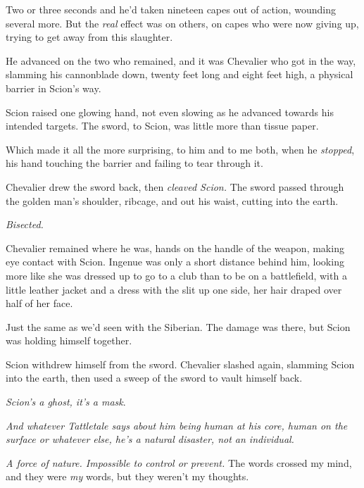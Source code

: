 Two or three seconds and he'd taken nineteen capes out of action, wounding several more.  But the \emph{real }effect was on others, on capes who were now giving up, trying to get away from this slaughter.



He advanced on the two who remained, and it was Chevalier who got in the way, slamming his cannonblade down, twenty feet long and eight feet high, a physical barrier in Scion's way.



Scion raised one glowing hand, not even slowing as he advanced towards his intended targets.  The sword, to Scion, was little more than tissue paper.



Which made it all the more surprising, to him and to me both, when he \emph{stopped}, his hand touching the barrier and failing to tear through it.



Chevalier drew the sword back, then \emph{cleaved Scion.  }The sword passed through the golden man's shoulder, ribcage, and out his waist, cutting into the earth.



\emph{Bisected.}



Chevalier remained where he was, hands on the handle of the weapon, making eye contact with Scion.  Ingenue was only a short distance behind him, looking more like she was dressed up to go to a club than to be on a battlefield, with a little leather jacket and a dress with the slit up one side,  her hair draped over half of her face.



Just the same as we'd seen with the Siberian.  The damage was there, but Scion was holding himself together.



Scion withdrew himself from the sword.  Chevalier slashed again, slamming Scion into the earth, then used a sweep of the sword to vault himself back.



\emph{Scion's a ghost, it's a mask}.



\emph{And whatever Tattletale says about him being human at his core, human on the surface or whatever else, he's a natural disaster, not an individual.}



\emph{A force of nature.  Impossible to control or prevent.  }The words crossed my mind, and they were \emph{my} words, but they weren't my thoughts.




